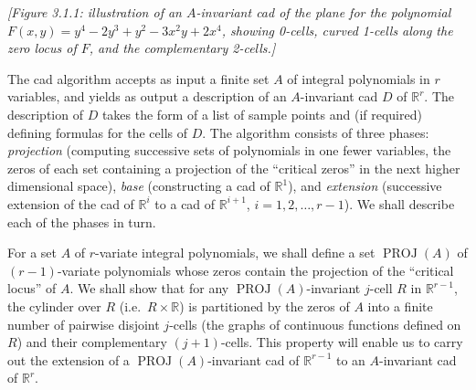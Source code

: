 \documentclass[11pt]{article}
\theoremstyle{plain}
\theoremstyle{definition}
\newcommand{\R}{\mathbb{R}}
\DeclareMathOperator{\PROJ}{PROJ}
\begin{document}
\begin{center}
\textit{[Figure 3.1.1: illustration of an $A$-invariant cad of the plane
for the polynomial $F(x,y) = y^4 - 2y^3 + y^2 - 3x^2 y + 2x^4$, showing
0-cells, curved 1-cells along the zero locus of $F$, and the
complementary 2-cells.]}
\end{center}

The cad algorithm accepts as input a finite set $A$ of integral
polynomials in $r$ variables, and yields as output a description of an
$A$-invariant cad $D$ of $\R^r$. The description of $D$ takes the form
of a list of sample points and (if required) defining formulas for the
cells of $D$. The algorithm consists of three phases: \emph{projection}
(computing successive sets of polynomials in one fewer variables, the
zeros of each set containing a projection of the ``critical zeros'' in
the next higher dimensional space), \emph{base} (constructing a cad of
$\R^1$), and \emph{extension} (successive extension of the cad of
$\R^i$ to a cad of $\R^{i+1}$, $i = 1, 2, \ldots, r-1$). We shall
describe each of the phases in turn.

For a set $A$ of $r$-variate integral polynomials, we shall define a
set $\PROJ(A)$ of $(r-1)$-variate polynomials whose zeros contain the
projection of the ``critical locus'' of $A$. We shall show that for any
$\PROJ(A)$-invariant $j$-cell $R$ in $\R^{r-1}$, the cylinder over $R$
(i.e.\ $R \times \R$) is partitioned by the zeros of $A$ into a finite
number of pairwise disjoint $j$-cells (the graphs of continuous
functions defined on $R$) and their complementary $(j+1)$-cells. This
property will enable us to carry out the extension of a
$\PROJ(A)$-invariant cad of $\R^{r-1}$ to an $A$-invariant cad of
$\R^r$.
\end{document}
